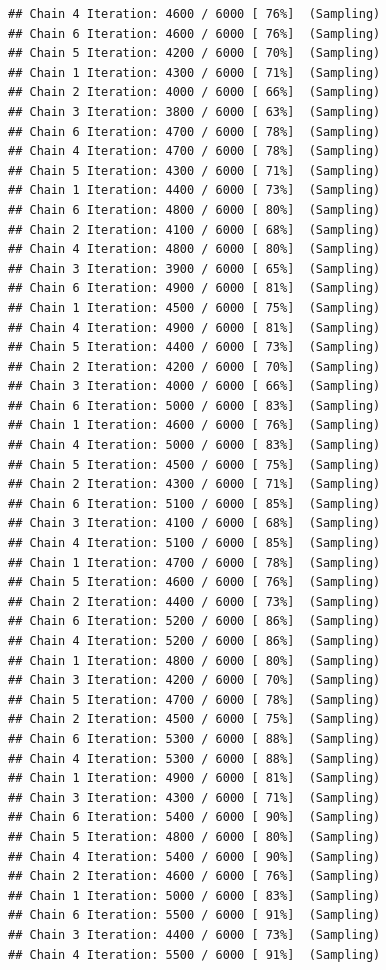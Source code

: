 \documentclass[
]{article}
\begin{document}
\begin{verbatim}
## Chain 4 Iteration: 4600 / 6000 [ 76%]  (Sampling) 
## Chain 6 Iteration: 4600 / 6000 [ 76%]  (Sampling) 
## Chain 5 Iteration: 4200 / 6000 [ 70%]  (Sampling) 
## Chain 1 Iteration: 4300 / 6000 [ 71%]  (Sampling) 
## Chain 2 Iteration: 4000 / 6000 [ 66%]  (Sampling) 
## Chain 3 Iteration: 3800 / 6000 [ 63%]  (Sampling) 
## Chain 6 Iteration: 4700 / 6000 [ 78%]  (Sampling) 
## Chain 4 Iteration: 4700 / 6000 [ 78%]  (Sampling) 
## Chain 5 Iteration: 4300 / 6000 [ 71%]  (Sampling) 
## Chain 1 Iteration: 4400 / 6000 [ 73%]  (Sampling) 
## Chain 6 Iteration: 4800 / 6000 [ 80%]  (Sampling) 
## Chain 2 Iteration: 4100 / 6000 [ 68%]  (Sampling) 
## Chain 4 Iteration: 4800 / 6000 [ 80%]  (Sampling) 
## Chain 3 Iteration: 3900 / 6000 [ 65%]  (Sampling) 
## Chain 6 Iteration: 4900 / 6000 [ 81%]  (Sampling) 
## Chain 1 Iteration: 4500 / 6000 [ 75%]  (Sampling) 
## Chain 4 Iteration: 4900 / 6000 [ 81%]  (Sampling) 
## Chain 5 Iteration: 4400 / 6000 [ 73%]  (Sampling) 
## Chain 2 Iteration: 4200 / 6000 [ 70%]  (Sampling) 
## Chain 3 Iteration: 4000 / 6000 [ 66%]  (Sampling) 
## Chain 6 Iteration: 5000 / 6000 [ 83%]  (Sampling) 
## Chain 1 Iteration: 4600 / 6000 [ 76%]  (Sampling) 
## Chain 4 Iteration: 5000 / 6000 [ 83%]  (Sampling) 
## Chain 5 Iteration: 4500 / 6000 [ 75%]  (Sampling) 
## Chain 2 Iteration: 4300 / 6000 [ 71%]  (Sampling) 
## Chain 6 Iteration: 5100 / 6000 [ 85%]  (Sampling) 
## Chain 3 Iteration: 4100 / 6000 [ 68%]  (Sampling) 
## Chain 4 Iteration: 5100 / 6000 [ 85%]  (Sampling) 
## Chain 1 Iteration: 4700 / 6000 [ 78%]  (Sampling) 
## Chain 5 Iteration: 4600 / 6000 [ 76%]  (Sampling) 
## Chain 2 Iteration: 4400 / 6000 [ 73%]  (Sampling) 
## Chain 6 Iteration: 5200 / 6000 [ 86%]  (Sampling) 
## Chain 4 Iteration: 5200 / 6000 [ 86%]  (Sampling) 
## Chain 1 Iteration: 4800 / 6000 [ 80%]  (Sampling) 
## Chain 3 Iteration: 4200 / 6000 [ 70%]  (Sampling) 
## Chain 5 Iteration: 4700 / 6000 [ 78%]  (Sampling) 
## Chain 2 Iteration: 4500 / 6000 [ 75%]  (Sampling) 
## Chain 6 Iteration: 5300 / 6000 [ 88%]  (Sampling) 
## Chain 4 Iteration: 5300 / 6000 [ 88%]  (Sampling) 
## Chain 1 Iteration: 4900 / 6000 [ 81%]  (Sampling) 
## Chain 3 Iteration: 4300 / 6000 [ 71%]  (Sampling) 
## Chain 6 Iteration: 5400 / 6000 [ 90%]  (Sampling) 
## Chain 5 Iteration: 4800 / 6000 [ 80%]  (Sampling) 
## Chain 4 Iteration: 5400 / 6000 [ 90%]  (Sampling) 
## Chain 2 Iteration: 4600 / 6000 [ 76%]  (Sampling) 
## Chain 1 Iteration: 5000 / 6000 [ 83%]  (Sampling) 
## Chain 6 Iteration: 5500 / 6000 [ 91%]  (Sampling) 
## Chain 3 Iteration: 4400 / 6000 [ 73%]  (Sampling) 
## Chain 4 Iteration: 5500 / 6000 [ 91%]  (Sampling) 

\end{verbatim}
\end{document}
